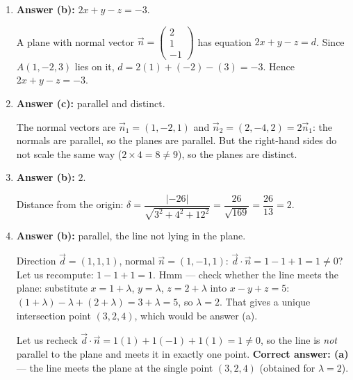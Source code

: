 \documentclass[11pt]{article}
\begin{document}
\begin{corrige}
\begin{enumerate}
\item \textbf{Answer (b):} $2x+y-z=-3$.\par
A plane with normal vector $\vec{n}=\begin{pmatrix}2\\1\\-1\end{pmatrix}$ has equation $2x+y-z=d$. Since $A(1,-2,3)$ lies on it, $d=2(1)+(-2)-(3)=-3$. Hence $2x+y-z=-3$.

\item \textbf{Answer (c):} parallel and distinct.\par
The normal vectors are $\vec{n}_1=(1,-2,1)$ and $\vec{n}_2=(2,-4,2)=2\vec{n}_1$: the normals are parallel, so the planes are parallel. But the right-hand sides do not scale the same way ($2\times 4=8\neq 9$), so the planes are distinct.

\item \textbf{Answer (b):} $2$.\par
Distance from the origin: $\delta=\dfrac{|{-26}|}{\sqrt{3^2+4^2+12^2}}=\dfrac{26}{\sqrt{169}}=\dfrac{26}{13}=2$.

\item \textbf{Answer (b):} parallel, the line not lying in the plane.\par
Direction $\vec{d}=(1,1,1)$, normal $\vec{n}=(1,-1,1)$: $\vec{d}\cdot\vec{n}=1-1+1=1\neq 0$? Let us recompute: $1-1+1=1$. Hmm — check whether the line meets the plane: substitute $x=1+\lambda$, $y=\lambda$, $z=2+\lambda$ into $x-y+z=5$: $(1+\lambda)-\lambda+(2+\lambda)=3+\lambda=5$, so $\lambda=2$. That gives a unique intersection point $(3,2,4)$, which would be answer (a).\par
Let us recheck $\vec{d}\cdot\vec{n}=1(1)+1(-1)+1(1)=1\neq 0$, so the line is \emph{not} parallel to the plane and meets it in exactly one point. \textbf{Correct answer: (a)} — the line meets the plane at the single point $(3,2,4)$ (obtained for $\lambda=2$).
\end{enumerate}
\end{corrige}
\end{document}
